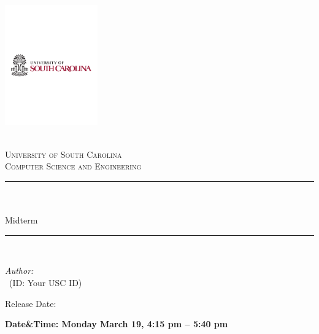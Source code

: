 \begin{titlepage}

\newcommand{\HRule}{\rule{\linewidth}{0.5mm}} %



\includegraphics[width = 4cm]{./figures/usc}\\[0.5cm] 

\begin{center} %

\textsc{\LARGE \reporttype}\\[1.5cm] 
\textsc{\Large University of South Carolina}\\[0.5cm] 
\textsc{\large Computer Science and Engineering}\\[0.5cm] 

\HRule \\[0.4cm]
{ \huge \bfseries \reporttitle}\\ %
{\Large Midterm}
\HRule \\[1.5cm]
\end{center}

\begin{flushleft} \large
\textit{Author:}\\
\reportauthor~(ID: Your USC ID) %
\end{flushleft}
\vspace{2cm}
\makeatletter
Release Date: \@date 

\textbf{Date\&Time: Monday March 19, 4:15 pm -- 5:40 pm}

\vfill %



\makeatother


\end{titlepage}

